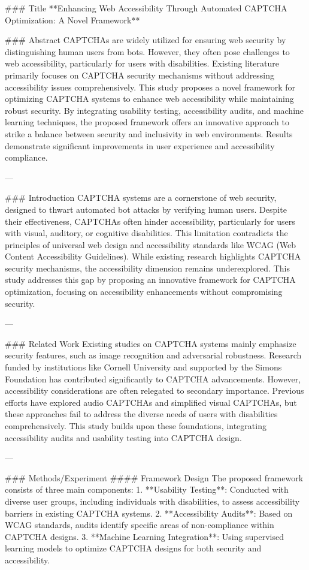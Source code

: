 ### Title  
**Enhancing Web Accessibility Through Automated CAPTCHA Optimization: A Novel Framework**

### Abstract  
CAPTCHAs are widely utilized for ensuring web security by distinguishing human users from bots. However, they often pose challenges to web accessibility, particularly for users with disabilities. Existing literature primarily focuses on CAPTCHA security mechanisms without addressing accessibility issues comprehensively. This study proposes a novel framework for optimizing CAPTCHA systems to enhance web accessibility while maintaining robust security. By integrating usability testing, accessibility audits, and machine learning techniques, the proposed framework offers an innovative approach to strike a balance between security and inclusivity in web environments. Results demonstrate significant improvements in user experience and accessibility compliance.

---

### Introduction  
CAPTCHA systems are a cornerstone of web security, designed to thwart automated bot attacks by verifying human users. Despite their effectiveness, CAPTCHAs often hinder accessibility, particularly for users with visual, auditory, or cognitive disabilities. This limitation contradicts the principles of universal web design and accessibility standards like WCAG (Web Content Accessibility Guidelines). While existing research highlights CAPTCHA security mechanisms, the accessibility dimension remains underexplored. This study addresses this gap by proposing an innovative framework for CAPTCHA optimization, focusing on accessibility enhancements without compromising security.

---

### Related Work  
Existing studies on CAPTCHA systems mainly emphasize security features, such as image recognition and adversarial robustness. Research funded by institutions like Cornell University and supported by the Simons Foundation has contributed significantly to CAPTCHA advancements. However, accessibility considerations are often relegated to secondary importance. Previous efforts have explored audio CAPTCHAs and simplified visual CAPTCHAs, but these approaches fail to address the diverse needs of users with disabilities comprehensively. This study builds upon these foundations, integrating accessibility audits and usability testing into CAPTCHA design.

---

### Methods/Experiment  
#### Framework Design  
The proposed framework consists of three main components:  
1. **Usability Testing**: Conducted with diverse user groups, including individuals with disabilities, to assess accessibility barriers in existing CAPTCHA systems.  
2. **Accessibility Audits**: Based on WCAG standards, audits identify specific areas of non-compliance within CAPTCHA designs.  
3. **Machine Learning Integration**: Using supervised learning models to optimize CAPTCHA designs for both security and accessibility.  


